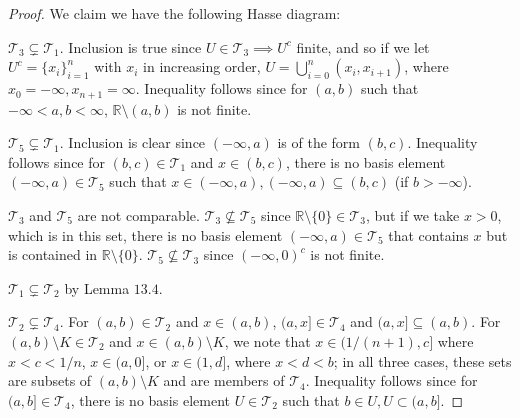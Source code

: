 \documentclass[12pt]{article}
\theoremstyle{remark}
\begin{document}
\begin{proof}
  We claim we have the following Hasse diagram:
  \begin{center}
  \end{center}
  \par $\mathcal{T}_3 \subsetneq \mathcal{T}_1$. Inclusion is true since $U \in \mathcal{T}_3 \implies U^c$ finite, and so if we let $U^c = \{x_i\}_{i=1}^n$ with $x_i$ in increasing order, $U = \bigcup_{i=0}^n (x_i,x_{i+1})$, where $x_0 = -\infty,x_{n+1} = \infty$. Inequality follows since for $(a,b)$ such that $-\infty < a,b < \infty$, $\mathbb{R} \setminus (a,b)$ is not finite.
  \par $\mathcal{T}_5 \subsetneq \mathcal{T}_1$. Inclusion is clear since
  $(-\infty,a)$ is of the form $(b,c)$. Inequality follows since for $(b,c) \in
  \mathcal{T}_1$ and $x \in (b,c)$, there is no basis element $(-\infty,a) \in
  \mathcal{T}_5$ such that $x \in (-\infty,a),(-\infty,a) \subseteq (b,c)$ (if
  $b > -\infty$).
  \par $\mathcal{T}_3$ and $\mathcal{T}_5$ are not comparable. $\mathcal{T}_3 \not\subseteq \mathcal{T}_5$ since $\mathbb{R} \setminus \{0\} \in \mathcal{T}_3$, but if we take $x > 0$, which is in this set, there is no basis element $(-\infty,a) \in \mathcal{T}_5$ that contains $x$ but is contained in $\mathbb{R} \setminus \{0\}$. $\mathcal{T}_5 \not\subseteq \mathcal{T}_3$ since $(-\infty,0)^c$ is not finite.
  \par $\mathcal{T}_1 \subsetneq \mathcal{T}_2$ by Lemma $13.4$.
  \par $\mathcal{T}_2 \subsetneq \mathcal{T}_4$. For $(a,b) \in \mathcal{T}_2$ and $x \in (a,b)$, $(a,x] \in \mathcal{T}_4$ and $(a,x] \subseteq (a,b)$. For $(a,b) \setminus K \in \mathcal{T}_2$ and $x \in (a,b) \setminus K$, we note that $x \in (1/(n+1),c]$ where $x < c < 1/n$, $x \in (a,0]$, or $x \in (1,d]$, where $x < d < b$; in all three cases, these sets are subsets of $(a,b) \setminus K$ and are members of $\mathcal{T}_4$. Inequality follows since for $(a,b] \in \mathcal{T}_4$, there is no basis element $U \in \mathcal{T}_2$ such that $b \in U,U \subset (a,b]$.
\end{proof}
\end{document}

